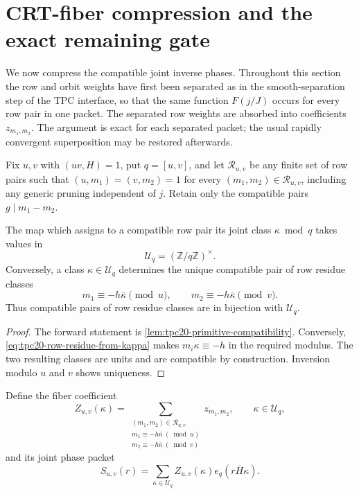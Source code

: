 \section{CRT-fiber compression and the exact remaining gate}
\label{sec:tpc20-fiber-compression}

We now compress the compatible joint inverse phases.  Throughout this
section the row and orbit weights have first been separated as in the
smooth-separation step of the TPC interface, so that the same function
\(F(j/J)\) occurs for every row pair in one packet.  The separated row
weights are absorbed into coefficients \(z_{m_1,m_2}\).  The argument is
exact for each separated packet; the usual rapidly convergent
superposition may be restored afterwards.

Fix \(u,v\) with \((uv,H)=1\), put \(q=[u,v]\), and let
\(\mathscr R_{u,v}\) be any finite set of row pairs such that
\((u,m_1)=(v,m_2)=1\) for every
\((m_1,m_2)\in\mathscr R_{u,v}\), including any generic pruning
independent of \(j\).  Retain only the compatible pairs
\(g\mid m_1-m_2\).

\begin{lemma}
\label{lem:tpc20-row-fiber-bijection}
The map which assigns to a compatible row pair its joint class
\(\kappa\bmod q\) takes values in
\begin{equation}
 \mathcal U_q=(\mathbb Z/q\mathbb Z)^{\times}.
 \label{eq:tpc20-unit-fibers}
\end{equation}
Conversely, a class \(\kappa\in\mathcal U_q\) determines the unique
compatible pair of row residue classes
\begin{equation}
 m_1\equiv-h\overline\kappa\pmod u,
 \qquad
 m_2\equiv-h\overline\kappa\pmod v.
 \label{eq:tpc20-row-residue-from-kappa}
\end{equation}
Thus compatible pairs of row residue classes are in bijection with
\(\mathcal U_q\).
\end{lemma}

\begin{proof}
The forward statement is
\cref{lem:tpc20-primitive-compatibility}.  Conversely,
\eqref{eq:tpc20-row-residue-from-kappa} makes
\(m_i\kappa\equiv-h\) in the required modulus.  The two resulting
classes are units and are compatible by construction.  Inversion modulo
\(u\) and \(v\) shows uniqueness.
\end{proof}

Define the fiber coefficient
\begin{equation}
 Z_{u,v}(\kappa)
 =\sum_{\substack{(m_1,m_2)\in\mathscr R_{u,v}\\
 m_1\equiv-h\overline\kappa\ (\bmod u)\\
 m_2\equiv-h\overline\kappa\ (\bmod v)}}
 z_{m_1,m_2},
 \qquad \kappa\in\mathcal U_q,
 \label{eq:tpc20-fiber-coefficient}
\end{equation}
and its joint phase packet
\begin{equation}
 S_{u,v}(r)
 =\sum_{\kappa\in\mathcal U_q}
 Z_{u,v}(\kappa)e_q(r\overline H\kappa).
 \label{eq:tpc20-fiber-DFT}
\end{equation}

